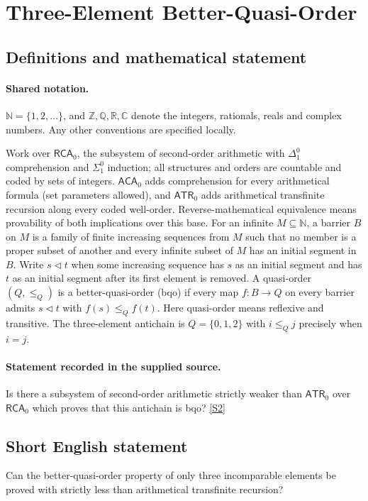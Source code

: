 \documentclass[11pt]{article}
\newcommand{\sref}[2]{\hyperlink{source:#1:#2}{[S#2]}}
\begin{document}
\section{Three-Element Better-Quasi-Order}\label{statement}

\subsection{Definitions and mathematical statement}

\paragraph{Shared notation.}$\mathbb N=\{1,2,\ldots\}$, and $\mathbb Z,\mathbb Q,\mathbb R,\mathbb C$ denote the integers, rationals, reals and complex numbers. Any other conventions are specified locally.


Work over $\mathsf{RCA}_0$, the subsystem of second-order arithmetic with $\Delta^0_1$ comprehension and $\Sigma^0_1$ induction; all structures and orders are countable and coded by sets of integers. $\mathsf{ACA}_0$ adds comprehension for every arithmetical formula (set parameters allowed), and $\mathsf{ATR}_0$ adds arithmetical transfinite recursion along every coded well-order. Reverse-mathematical equivalence means provability of both implications over this base. For an infinite $M\subseteq\mathbb N$, a barrier $B$ on $M$ is a family of finite increasing sequences from $M$ such that no member is a proper subset of another and every infinite subset of $M$ has an initial segment in $B$. Write $s\triangleleft t$ when some increasing sequence has $s$ as an initial segment and has $t$ as an initial segment after its first element is removed. A quasi-order $(Q,\le_Q)$ is a better-quasi-order (bqo) if every map $f:B\to Q$ on every barrier admits $s\triangleleft t$ with $f(s)\le_Q f(t)$. Here quasi-order means reflexive and transitive. The three-element antichain is $Q=\{0,1,2\}$ with $i\le_Q j$ precisely when $i=j$.
\paragraph{Statement recorded in the supplied source.}
Is there a subsystem of second-order arithmetic strictly weaker than $\mathsf{ATR}_0$ over $\mathsf{RCA}_0$ which proves that this antichain is bqo? \sref{statement}{2}
\subsection{Short English statement}
Can the better-quasi-order property of only three incomparable elements be proved with strictly less than arithmetical transfinite recursion?
\end{document}
